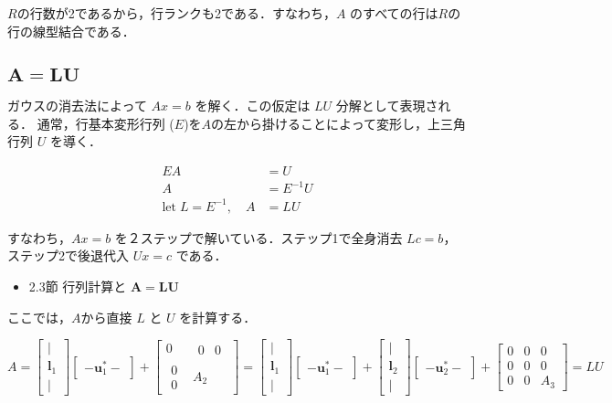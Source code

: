 \documentclass[letterpaper]{article}
\begin{document}
$R$の行数が2であるから，行ランクも2である．すなわち，$A$ のすべての行は$R$の行の線型結合である．

\clearpage

\subsection{$\boldsymbol{A=LU}$}

ガウスの消去法によって $Ax=b$ を解く．この仮定は $LU$ 分解として表現される．
通常，行基本変形行列 ($E$)を$A$の左から掛けることによって変形し，上三角行列 $U$ を導く．

\begin{align*}
  EA &= U\\
  A &= E^{-1}U\\
\text{let} \; L = E^{-1}, \quad  A &= LU
\end{align*}

すなわち，$Ax=b$ を２ステップで解いている．ステップ1で全身消去 $Lc=b$，ステップ2で後退代入 $Ux=c$ である．

\begin{itemize}
  \item 2.3節 行列計算と $\bm{A=LU}$
\end{itemize}

ここでは，$A$から直接 $L$ と $U$ を計算する．

\begin{equation*}
  A = 
      \begin{bmatrix}
        |\\
        \bm{l}_1\\
        |
      \end{bmatrix}
      \begin{bmatrix}
        -  \bm{u}^*_1  -
      \end{bmatrix}
  +  \begin{bmatrix}
      0 & \begin{matrix} 0 & 0 \end{matrix}\\
      \begin{matrix} 0 \\ 0 \end{matrix} & A_2
    \end{bmatrix}
  = 
  \begin{bmatrix}
    |\\
    \bm{l}_1\\
    |
  \end{bmatrix}
  \begin{bmatrix}
    - \bm{u}^*_1 -
  \end{bmatrix}
  +
  \begin{bmatrix}
    |\\
    \bm{l}_2\\
    |
  \end{bmatrix}
  \begin{bmatrix}
    - \bm{u}^*_2  -
  \end{bmatrix}
  +  \begin{bmatrix}
  0 & 0 & 0\\
  0 & 0 & 0 \\
  0 & 0 & A_3
  \end{bmatrix} = LU
\end{equation*}
 
\end{document}
